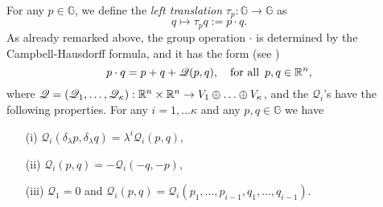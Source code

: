 \documentclass[10pt, a4paper,
oneside, headinclude,footinclude]{scrartcl}
\begin{document}
For any $p\in \mathbb{G}$, we define the {\em left translation} $\tau _p:\mathbb{G} \to \mathbb{G}$ as\label{tran}
\begin{equation*}
q \mapsto \tau _p q := p\cdot q.
\end{equation*}
As already remarked above, the group operation $\cdot$ is determined by the Campbell-Hausdorff formula, and it has the form (see \cite[Proposition 2.1]{step2})
\begin{equation*}
p\cdot q= p+q+\mathscr{Q}(p,q), \quad \mbox{for all }\, p,q \in  \mathbb{R}^n,
\end{equation*} 
where $\mathscr{Q}=(\mathscr{Q}_1,\dots , \mathscr{Q}_\kappa):\mathbb{R}^n\times \mathbb{R}^n \to V_1\oplus\ldots\oplus V_\kappa$, and the $\mathscr{Q}_i$'s have the following properties. For any $i=1,\ldots \kappa$ and any $p,q\in \mathbb{G}$ we have
\begin{itemize}
    \item[(i)]$\mathscr{Q}_i(\delta_\lambda p,\delta_\lambda q)=\lambda^i\mathscr{Q}_i(p,q)$,
    \item[(ii)] $\mathscr{Q}_i(p,q)=-\mathscr{Q}_i(-q,-p)$,
    \item[(iii)] $\mathscr{Q}_1=0$ and $\mathscr{Q}_i(p,q)=\mathscr{Q}_i(p_1,\ldots,p_{i-1},q_1,\ldots,q_{i-1})$.
\end{itemize}
%
\end{document}
